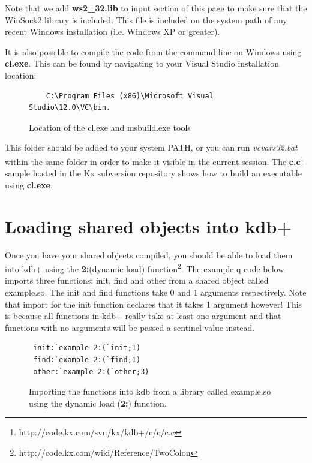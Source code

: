  Note that we add \textbf{ws2\_32.lib} to input section of this page to make sure that the WinSock2 library is included. This file is included on the system path of any recent Windows installation (i.e. Windows XP or greater).
 
 It is also possible to compile the code from the command line on Windows using \textbf{cl.exe}. This can be found by navigating to your Visual Studio installation
 location:
 
 \begin{figure}[H]
 	\begin{lstlisting}
 	C:\Program Files (x86)\Microsoft Visual Studio\12.0\VC\bin.
 	\end{lstlisting}
 	\caption{Location of the cl.exe and msbuild.exe tools}
 \end{figure}
 
 This folder should be added to your system PATH, or you can run \textit{vcvars32.bat} within the same folder in order to make it visible in the current session. The \textbf{c.c}\footnote{http://code.kx.com/svn/kx/kdb+/c/c/c.c} sample hosted in the Kx subversion repository shows how to build an executable using \textbf{cl.exe}.
 
 \section{Loading shared objects into kdb+}
 
 Once you have your shared objects compiled, you should be able to load them into kdb+ using the \textbf{2:}(dynamic load) function\footnote{http://code.kx.com/wiki/Reference/TwoColon}. The example q code below imports three functions: init, find and other from a shared object called example.so. The init and find functions take 0 and 1 arguments respectively. Note that import for the init function declares that it takes 1 argument however! This is because all functions in kdb+ really take at least one argument and that functions with no arguments will be passed a sentinel value instead.
 
 \begin{figure}[H]
 \begin{lstlisting}
 init:`example 2:(`init;1)
 find:`example 2:(`find;1)
 other:`example 2:(`other;3)
 \end{lstlisting}
 \caption{Importing the functions into kdb from a library called example.so using the dynamic load (\textbf{2:}) function.}
 \end{figure}
 
